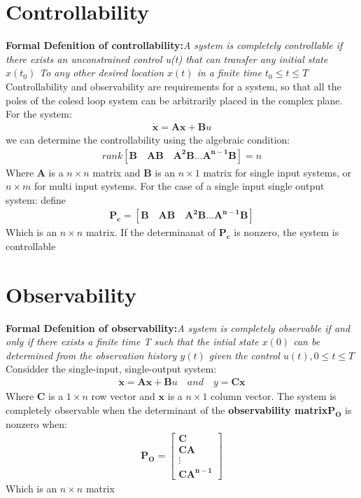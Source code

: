 \documentclass{report}
\begin{document}
	\section{Controllability}
	\label{sub:controllability}
{\bf Formal Defenition of controllability:}\emph{A system is completely controllable if there exists an unconstrained control u(t) that can transfer any initial state $x(t_0)$ To any other desired location $x(t)$ in a finite time $t_0 \leq t \leq T$}\\
Controllability and observability are requirements for a system, so that all the poles of the colesd loop system can be arbitrarily placed in the complex plane.\\
For the system:
\begin{align*}
\dot{\mathbf{x}} = \mathbf{Ax+B}u	
\end{align*}
we can determine the controllability using the algebraic condition:
\begin{align*}
rank[\mathbf{B \quad AB \quad A^2B \ldots A^{n-1}B }] = n	
\end{align*}
Where $\mathbf{A}$ is a $n \times n$ matrix and $\mathbf{B}$ is an $n \times 1$ matrix for single input systems, or $n \times m$ for multi input systems.
For the case of a single input single output system: define
\begin{align*}
\mathbf{P_c = [\mathbf{B \quad AB \quad A^2B \ldots A^{n-1}B }]}	
\end{align*}
Which is an $n \times n$ matrix. If the determinanat of $\mathbf{P_c}$ is nonzero, the system is controllable\\



	\section{Observability}

\label{sub:observability}
{\bf Formal Defenition of observability:}\emph{A system is completely observable if and only if there exists a finite time T such that the intial state $x(0)$ can be determined from the observation history $y(t)$ given the control $u(t), 0 \leq t \leq T$}\\
Considder the single-input, single-output system:
\begin{align*}
\mathbf{\dot{x} = Ax +B}u \quad and \quad y = \mathbf{Cx}	
\end{align*}
Where $\mathbf{C}$ is a $1 \times n$ row vector and $\mathbf{x}$ is a $n \times 1$ column vector. The system is completely observable when the determinant of the {\bf observability matrix$\mathbf{P_O}$} is nonzero when:
\begin{align*}
\mathbf{P_O} = \left[ 	\begin{matrix}
 		\mathbf{C}\\\mathbf{CA}\\ \vdots \\\mathbf{CA^{n-1}}
 	\end{matrix}
 	\right]
 \end{align*} 
 Which is an $n \times n$ matrix
\end{document}
